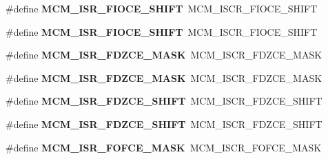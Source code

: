 \begin{DoxyCompactItemize}
\item 
\#define {\bfseries M\+C\+M\+\_\+\+I\+S\+R\+\_\+\+F\+I\+O\+C\+E\+\_\+\+S\+H\+I\+FT}~M\+C\+M\+\_\+\+I\+S\+C\+R\+\_\+\+F\+I\+O\+C\+E\+\_\+\+S\+H\+I\+FT\hypertarget{group__Backward__Compatibility__Symbols_ga0d01a10f2c69f6ca26f2e7c8b94f2f2c}{}\label{group__Backward__Compatibility__Symbols_ga0d01a10f2c69f6ca26f2e7c8b94f2f2c}

\item 
\#define {\bfseries M\+C\+M\+\_\+\+I\+S\+R\+\_\+\+F\+I\+O\+C\+E\+\_\+\+S\+H\+I\+FT}~M\+C\+M\+\_\+\+I\+S\+C\+R\+\_\+\+F\+I\+O\+C\+E\+\_\+\+S\+H\+I\+FT\hypertarget{group__Backward__Compatibility__Symbols_ga0d01a10f2c69f6ca26f2e7c8b94f2f2c}{}\label{group__Backward__Compatibility__Symbols_ga0d01a10f2c69f6ca26f2e7c8b94f2f2c}

\item 
\#define {\bfseries M\+C\+M\+\_\+\+I\+S\+R\+\_\+\+F\+D\+Z\+C\+E\+\_\+\+M\+A\+SK}~M\+C\+M\+\_\+\+I\+S\+C\+R\+\_\+\+F\+D\+Z\+C\+E\+\_\+\+M\+A\+SK\hypertarget{group__Backward__Compatibility__Symbols_ga3bc1a6b47a2b34387b9a9a4dfe7d9e15}{}\label{group__Backward__Compatibility__Symbols_ga3bc1a6b47a2b34387b9a9a4dfe7d9e15}

\item 
\#define {\bfseries M\+C\+M\+\_\+\+I\+S\+R\+\_\+\+F\+D\+Z\+C\+E\+\_\+\+M\+A\+SK}~M\+C\+M\+\_\+\+I\+S\+C\+R\+\_\+\+F\+D\+Z\+C\+E\+\_\+\+M\+A\+SK\hypertarget{group__Backward__Compatibility__Symbols_ga3bc1a6b47a2b34387b9a9a4dfe7d9e15}{}\label{group__Backward__Compatibility__Symbols_ga3bc1a6b47a2b34387b9a9a4dfe7d9e15}

\item 
\#define {\bfseries M\+C\+M\+\_\+\+I\+S\+R\+\_\+\+F\+D\+Z\+C\+E\+\_\+\+S\+H\+I\+FT}~M\+C\+M\+\_\+\+I\+S\+C\+R\+\_\+\+F\+D\+Z\+C\+E\+\_\+\+S\+H\+I\+FT\hypertarget{group__Backward__Compatibility__Symbols_gaec1aefd34fd89aacc598bcdc6ebcd331}{}\label{group__Backward__Compatibility__Symbols_gaec1aefd34fd89aacc598bcdc6ebcd331}

\item 
\#define {\bfseries M\+C\+M\+\_\+\+I\+S\+R\+\_\+\+F\+D\+Z\+C\+E\+\_\+\+S\+H\+I\+FT}~M\+C\+M\+\_\+\+I\+S\+C\+R\+\_\+\+F\+D\+Z\+C\+E\+\_\+\+S\+H\+I\+FT\hypertarget{group__Backward__Compatibility__Symbols_gaec1aefd34fd89aacc598bcdc6ebcd331}{}\label{group__Backward__Compatibility__Symbols_gaec1aefd34fd89aacc598bcdc6ebcd331}

\item 
\#define {\bfseries M\+C\+M\+\_\+\+I\+S\+R\+\_\+\+F\+O\+F\+C\+E\+\_\+\+M\+A\+SK}~M\+C\+M\+\_\+\+I\+S\+C\+R\+\_\+\+F\+O\+F\+C\+E\+\_\+\+M\+A\+SK\hypertarget{group__Backward__Compatibility__Symbols_gaad457cfff1c2d9349ece02993cc593a0}{}\label{group__Backward__Compatibility__Symbols_gaad457cfff1c2d9349ece02993cc593a0}


\end{DoxyCompactItemize}

